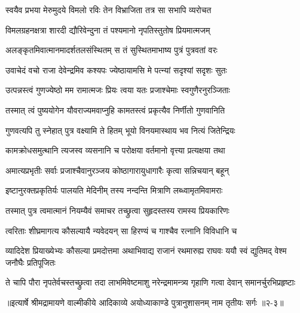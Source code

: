 \twolineshloka
{स्वयैव प्रभया मेरुमुदये विमलो रविः}
{तेन विभ्राजिता तत्र सा सभापि व्यरोचत} %

\twolineshloka
{विमलग्रहनक्षत्रा शारदी द्यौरिवेन्दुना}
{तं पश्यमानो नृपतिस्तुतोष प्रियमात्मजम्} %

\twolineshloka
{अलङ्कृतमिवात्मानमादर्शतलसंस्थितम्}
{स तं सुस्थितमाभाष्य पुत्रं पुत्रवतां वरः} %

\twolineshloka
{उवाचेदं वचो राजा देवेन्द्रमिव कश्यपः}
{ज्येष्ठायामसि मे पत्न्यां सदृश्यां सदृशः सुतः} %

\twolineshloka
{उत्पन्नस्त्वं गुणज्येष्ठो मम रामात्मजः प्रियः}
{त्वया यतः प्रजाश्चेमाः स्वगुणैरनुरञ्जिताः} %

\twolineshloka
{तस्मात् त्वं पुष्ययोगेन यौवराज्यमवाप्नुहि}
{कामतस्त्वं प्रकृत्यैव निर्णीतो गुणवानिति} %

\twolineshloka
{गुणवत्यपि तु स्नेहात् पुत्र वक्ष्यामि ते हितम्}
{भूयो विनयमास्थाय भव नित्यं जितेन्द्रियः} %

\twolineshloka
{कामक्रोधसमुत्थानि त्यजस्व व्यसनानि च}
{परोक्षया वर्तमानो वृत्त्या प्रत्यक्षया तथा} %

\twolineshloka
{अमात्यप्रभृतीः सर्वाः प्रजाश्चैवानुरञ्जय}
{कोष्ठागारायुधागारैः कृत्वा सन्निचयान् बहून्} %

\twolineshloka
{इष्टानुरक्तप्रकृतिर्यः पालयति मेदिनीम्}
{तस्य नन्दन्ति मित्राणि लब्ध्वामृतमिवामराः} %

\twolineshloka
{तस्मात् पुत्र त्वमात्मानं नियम्यैवं समाचर}
{तच्छ्रुत्वा सुहृदस्तस्य रामस्य प्रियकारिणः} %

\twolineshloka
{त्वरिताः शीघ्रमागत्य कौसल्यायै न्यवेदयन्}
{सा हिरण्यं च गाश्चैव रत्नानि विविधानि च} %

\threelineshloka
{व्यादिदेश प्रियाख्येभ्यः कौसल्या प्रमदोत्तमा}
{अथाभिवाद्य राजानं रथमारुह्य राघवः}
{ययौ स्वं द्युतिमद् वेश्म जनौघैः प्रतिपूजितः} %

\twolineshloka
{ते चापि पौरा नृपतेर्वचस्तच्छ्रुत्वा तदा लाभमिवेष्टमाशु}
{नरेन्द्रमामन्त्र्य गृहाणि गत्वा देवान् समानर्चुरभिप्रहृष्टाः} %


॥इत्यार्षे श्रीमद्रामायणे वाल्मीकीये आदिकाव्ये अयोध्याकाण्डे पुत्रानुशासनम् नाम तृतीयः सर्गः ॥२-३॥

